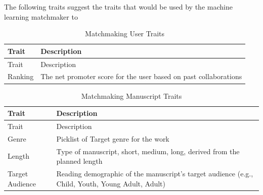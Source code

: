 \documentclass[11pt,openany]{book}
\begin{document}
The following traits suggest the traits that would be used by the
machine learning matchmaker to

\begin{longtable}[]{@{}ll@{}}
\caption{Matchmaking User Traits}\tabularnewline
\toprule
Trait & Description\tabularnewline
\midrule
\endfirsthead
\toprule
Trait & Description\tabularnewline
\midrule
\endhead
Ranking & The net promoter score for the user based on past
collaborations\tabularnewline
\bottomrule
\end{longtable}

\begin{longtable}[]{@{}ll@{}}
\caption{Matchmaking Manuscript Traits}\tabularnewline
\toprule
\begin{minipage}[b]{0.21\columnwidth}\raggedright
Trait\strut
\end{minipage} & \begin{minipage}[b]{0.73\columnwidth}\raggedright
Description\strut
\end{minipage}\tabularnewline
\midrule
\endfirsthead
\toprule
\begin{minipage}[b]{0.21\columnwidth}\raggedright
Trait\strut
\end{minipage} & \begin{minipage}[b]{0.73\columnwidth}\raggedright
Description\strut
\end{minipage}\tabularnewline
\midrule
\endhead
\begin{minipage}[t]{0.21\columnwidth}\raggedright
Genre\strut
\end{minipage} & \begin{minipage}[t]{0.73\columnwidth}\raggedright
Picklist of Target genre for the work\strut
\end{minipage}\tabularnewline
\begin{minipage}[t]{0.21\columnwidth}\raggedright
Length\strut
\end{minipage} & \begin{minipage}[t]{0.73\columnwidth}\raggedright
Type of manuscript, short, medium, long, derived from the planned
length\strut
\end{minipage}\tabularnewline
\begin{minipage}[t]{0.21\columnwidth}\raggedright
Target Audience\strut
\end{minipage} & \begin{minipage}[t]{0.73\columnwidth}\raggedright
Reading demographic of the manuscript's target audience (e.g., Child,
Youth, Young Adult, Adult)\strut
\end{minipage}\tabularnewline

\end{longtable}
\end{document}
